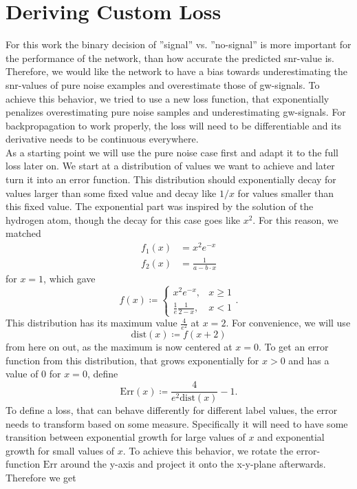 \section{Deriving Custom Loss}\label{app:custom_loss}
For this work the binary decision of ''signal'' vs. ''no-signal'' is more important for the performance of the network, than how accurate the predicted \gls{snr}-value is. Therefore, we would like the network to have a bias towards underestimating the \gls{snr}-values of pure noise examples and overestimate those of \gls{gw}-signals. To achieve this behavior, we tried to use a new loss function, that exponentially penalizes overestimating pure noise samples and underestimating \gls{gw}-signals. For backpropagation to work properly, the loss will need to be differentiable and its derivative needs to be continuous everywhere.\\
As a starting point we will use the pure noise case first and adapt it to the full loss later on. We start at a distribution of values we want to achieve and later turn it into an error function. This distribution should exponentially decay for values larger than some fixed value and decay like $1/x$ for values smaller than this fixed value. The exponential part was inspired by the solution of the hydrogen atom, though the decay for this case goes like $x^2$. For this reason, we matched
\begin{align}
f_1(x) & = x^2 e^{-x}\\
f_2(x) & = \frac{1}{a-b\cdot x}
\end{align}
for $x=1$, which gave
\begin{equation}
f(x)\coloneqq
\begin{cases}
	x^2 e^{-x}, & x \geq 1\\
	\frac{1}{e}\frac{1}{2-x}, & x < 1
\end{cases}.
\end{equation}
This distribution has its maximum value $\frac{4}{e^2}$ at $x=2$. For convenience, we will use
\begin{equation}
\text{dist}(x)\coloneqq f(x+2)
\end{equation}
from here on out, as the maximum is now centered at $x=0$. To get an error function from this distribution, that grows exponentially for $x>0$ and has a value of $0$ for $x=0$, define
\begin{equation}
\text{Err}(x)\coloneqq \frac{4}{e^2 \text{dist}(x)} - 1.
\end{equation}
To define a loss, that can behave differently for different label values, the error needs to transform based on some measure. Specifically it will need to have some transition between exponential growth for large values of $x$ and exponential growth for small values of $x$. To achieve this behavior, we rotate the error-function $\text{Err}$ around the y-axis and project it onto the x-y-plane afterwards. Therefore we get
